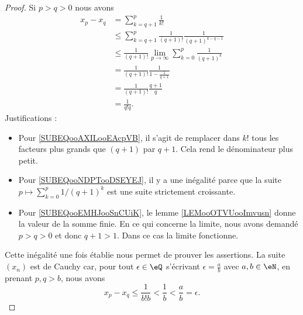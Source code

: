 \begin{proof}
    Si \( p>q>0\) nous avons
    \begin{subequations}
        \begin{align}
            x_p-x_q&=\sum_{k=q+1}^p\frac{1}{ k! }\\
            &\leq \sum_{k=q+1}^p\frac{1}{ (q+1)! }\frac{1}{ (q+1)^{k-q-1} }  \label{SUBEQooAXILooEAcpVB}\\ 
            &\leq \frac{1}{ (q+1)! }\lim_{p\to \infty} \sum_{k=0}^{p}\frac{1}{ (q+1)^k }  \label{SUBEQooNDPTooDSEYEJ}\\
            &=\frac{1}{ (q+1)! }\frac{1}{ 1-\frac{1}{ q+1 } } \label{SUBEQooEMHJooSnCUiK}  \\
            &=\frac{1}{ (q+1)! }\frac{q+1}{q}\\
            &=\frac{1}{ q!q }.
        \end{align}
    \end{subequations}
    Justifications :
    \begin{itemize}
        \item Pour \eqref{SUBEQooAXILooEAcpVB}, il s'agit de remplacer dans \( k!\) tous les facteurs plus grands que \( (q+1)\) par \( q+1\). Cela rend le dénominateur plus petit.
        \item Pour \eqref{SUBEQooNDPTooDSEYEJ}, il y a une inégalité parce que la suite \( p\mapsto \sum_{k=0}^p1/(q+1)^k\) est une suite strictement croissante.
            
        \item Pour \eqref{SUBEQooEMHJooSnCUiK}, le lemme \ref{LEMooOTVUooImvusn} donne la valeur de la somme finie. En ce qui concerne la limite, nous avons demandé \( p>q>0\) et donc \( q+1>1\). Dans ce cas la limite fonctionne.
    \end{itemize}

    Cette inégalité une fois établie nous permet de prouver les assertions. La suite \( (x_n) \) est de Cauchy car, pour tout \( \epsilon\in\eQ\) s'écrivant \( \epsilon=\frac{ a }{ b }\) avec \( a,b\in \eN\), en prenant \( p,q>b\), nous avons
    \begin{equation}
        x_p-x_q\leq \frac{1}{ b!b }<\frac{1}{ b }<\frac{ a }{ b }=\epsilon.
    \end{equation}


\end{proof}
